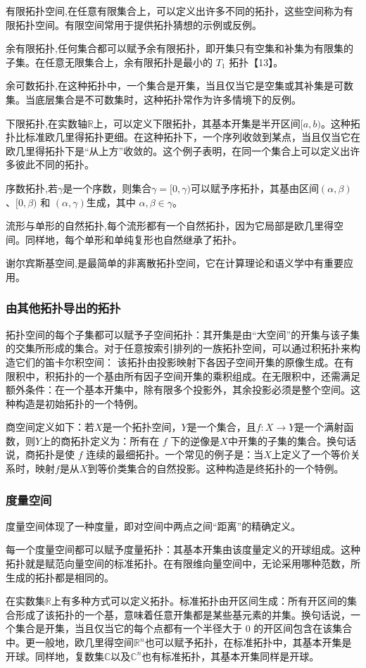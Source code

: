 有限拓扑空间,在任意有限集合上，可以定义出许多不同的拓扑，这些空间称为有限拓扑空间。有限空间常用于提供拓扑猜想的示例或反例。

余有限拓扑,任何集合都可以赋予余有限拓扑，即开集只有空集和补集为有限集的子集。在任意无限集合上，余有限拓扑是最小的 $T_1$ 拓扑【13】。

余可数拓扑,在这种拓扑中，一个集合是开集，当且仅当它是空集或其补集是可数集。当底层集合是不可数集时，这种拓扑常作为许多情境下的反例。

下限拓扑,在实数轴$\mathbb{R}$上，可以定义下限拓扑，其基本开集是半开区间$[a, b)$。这种拓扑比标准欧几里得拓扑更细。在这种拓扑下，一个序列收敛到某点，当且仅当它在欧几里得拓扑下是“从上方”收敛的。这个例子表明，在同一个集合上可以定义出许多彼此不同的拓扑。

序数拓扑,若$\gamma$是一个序数，则集合$\gamma = [0, \gamma)$可以赋予序拓扑，其基由区间$(\alpha, \beta)$、$[0, \beta)$ 和 $(\alpha, \gamma)$生成，其中 $\alpha, \beta \in \gamma$。

流形与单形的自然拓扑,每个流形都有一个自然拓扑，因为它局部是欧几里得空间。同样地，每个单形和单纯复形也自然继承了拓扑。

谢尔宾斯基空间,是最简单的非离散拓扑空间，它在计算理论和语义学中有重要应用。
\subsubsection{由其他拓扑导出的拓扑}
拓扑空间的每个子集都可以赋予子空间拓扑：其开集是由“大空间”的开集与该子集的交集所形成的集合。对于任意按索引排列的一族拓扑空间，可以通过积拓扑来构造它们的笛卡尔积空间：
该拓扑由投影映射下各因子空间开集的原像生成。在有限积中，积拓扑的一个基由所有因子空间开集的乘积组成。在无限积中，还需满足额外条件：在一个基本开集中，除有限多个投影外，其余投影必须是整个空间。这种构造是初始拓扑的一个特例。

商空间定义如下：若$X$是一个拓扑空间，$Y$是一个集合，且$f: X \to Y$是一个满射函数，则$Y$上的商拓扑定义为：所有在 $f$ 下的逆像是$X$中开集的子集的集合。换句话说，商拓扑是使 $f$ 连续的最细拓扑。一个常见的例子是：当$X$上定义了一个等价关系时，映射$f$是从$X$到等价类集合的自然投影。这种构造是终拓扑的一个特例。
\subsubsection{度量空间}
度量空间体现了一种度量，即对空间中两点之间“距离”的精确定义。

每一个度量空间都可以赋予度量拓扑：其基本开集由该度量定义的开球组成。这种拓扑就是赋范向量空间的标准拓扑。在有限维向量空间中，无论采用哪种范数，所生成的拓扑都是相同的。

在实数集$\mathbb{R}$上有多种方式可以定义拓扑。标准拓扑由开区间生成：所有开区间的集合形成了该拓扑的一个基，意味着任意开集都是某些基元素的并集。换句话说，一个集合是开集，当且仅当它的每个点都有一个半径大于 0 的开区间包含在该集合中。更一般地，欧几里得空间$\mathbb{R}^n$也可以赋予拓扑，在标准拓扑中，其基本开集是开球。同样地，复数集$\mathbb{C}$以及$\mathbb{C}^n$也有标准拓扑，其基本开集同样是开球。
